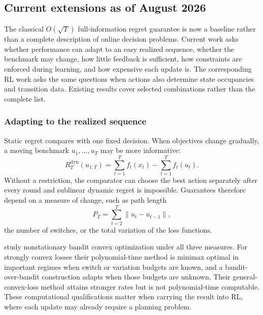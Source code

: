 \subsection{Current extensions as of August 2026}
\label{sec:online_current_extensions}

The classical $O(\sqrt T)$ full-information regret guarantee is now a baseline rather than a complete description of online decision problems. Current work asks whether performance can adapt to an easy realized sequence, whether the benchmark may change, how little feedback is sufficient, how constraints are enforced during learning, and how expensive each update is. The corresponding RL work asks the same questions when actions also determine state occupancies and transition data. Existing results cover selected combinations rather than the complete list.

\subsubsection{Adapting to the realized sequence}

Static regret compares with one fixed decision. When objectives change gradually, a moving benchmark $u_1,\ldots,u_T$ may be more informative:
\begin{equation}
R_T^{\mathrm{dyn}}(u_{1:T})
=
\sum_{t=1}^T f_t(x_t)
-
\sum_{t=1}^T f_t(u_t).
\label{eq:online_dynamic_regret}
\end{equation}
Without a restriction, the comparator can choose the best action separately after every round and sublinear dynamic regret is impossible. Guarantees therefore depend on a measure of change, such as path length
\begin{equation}
P_T
=
\sum_{t=2}^T\lVert u_t-u_{t-1}\rVert,
\label{eq:online_path_length}
\end{equation}
the number of switches, or the total variation of the loss functions.

\citet{liu2025nonstationary} study nonstationary bandit convex optimization under all three measures. For strongly convex losses their polynomial-time method is minimax optimal in important regimes when switch or variation budgets are known, and a bandit-over-bandit construction adapts when those budgets are unknown. Their general-convex-loss method attains stronger rates but is not polynomial-time computable. These computational qualifications matter when carrying the result into RL, where each update may already require a planning problem.

